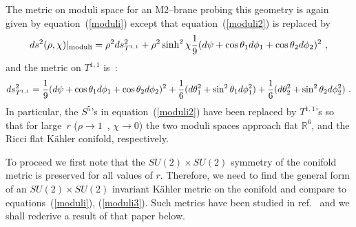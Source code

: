 \documentclass[a4paper,12pt]{article}
\newcommand{\labell}[1]{\label{#1}}
\newcommand{\reef}[1]{(\ref{#1})}
\begin{document}
The metric on moduli space for an M2--brane probing this geometry is
again given by equation~\reef{moduli} except that
equation~\reef{moduli2} is replaced by
\begin{equation}
 ds^2(\rho , \chi)
\arrowvert_{\rm moduli} = \rho^2 ds^2 _{T^{1,1}} 
+ \rho^2 \sinh^2 \chi {1 \over 9} (d\psi + \cos \theta_1 d \phi_1 
+\cos \theta_2 d \phi_2)^2 \ ,
 \labell{moduli3}
\end{equation}
and the metric on $T^{1,1}$ is~\cite{candelas}:
\begin{equation}
 ds^2 _{T^{1,1}} = {1 \over 9} (d\psi + \cos \theta_1 d \phi_1 
+\cos \theta_2 d \phi_2)^2 + {1 \over 6} (d \theta_1 ^2 
+ \sin ^2 \theta_1 d \phi_1 ^2) +{1 \over 6} (d \theta_2 ^2 
+ \sin ^2 \theta_2 d \phi_2 ^2)\ .
 \labell{T11metric}
\end{equation}
In particular, the  $S^5$'s in equation~\reef{moduli2} have
been replaced by $T^{1,1}$'s  so that for
large~$r$ ($\rho \to 1$~, $\chi \to 0$) the two moduli spaces approach
flat $\mathbb{R}^6$, and the Ricci flat K\"ahler conifold,
respectively.

To proceed we first note that the $SU(2) \times SU(2)$ symmetry of the
conifold metric is preserved for all values of $r$. Therefore, we need
to find the general form of an $SU(2) \times SU(2)$ invariant K\"ahler
metric on the conifold and compare to equations~\reef{moduli},
\reef{moduli3}. Such metrics have been studied in ref.~\cite{candelas}
and we shall rederive a result of that paper below.
\end{document}
